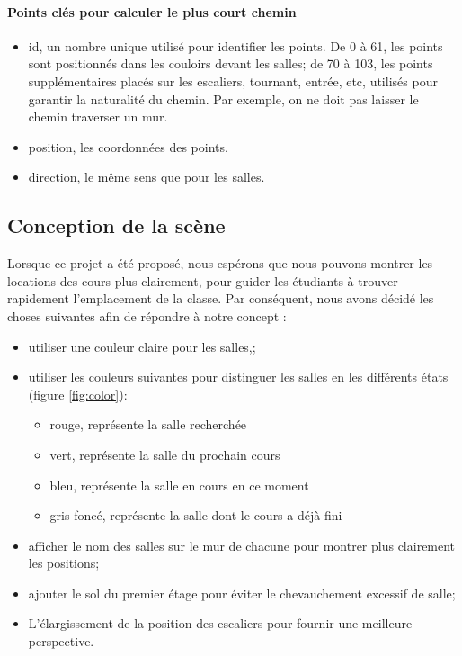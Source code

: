 \documentclass[twoside]{EPURapport}
\begin{document}
\paragraph{Points clés pour calculer le plus court chemin}

\begin{itemize}
	\item id, un nombre unique utilisé pour identifier les points. De 0 à 61, les points sont positionnés dans les couloirs devant les salles; de 70 à 103, les points supplémentaires placés sur les escaliers, tournant, entrée, etc, utilisés pour garantir la naturalité du chemin. Par exemple, on ne doit pas laisser le chemin traverser un mur. 
    \item position, les coordonnées des points.
    \item direction, le même sens que pour les salles.
\end{itemize}

\subsection{Conception de la scène}
Lorsque ce projet a été proposé, nous espérons que nous pouvons montrer les locations des cours plus clairement, pour guider les étudiants à trouver rapidement l'emplacement de la classe. Par conséquent, nous avons décidé les choses suivantes afin de répondre à notre concept :

\begin{itemize}
\item utiliser une couleur claire pour les salles,;
\item utiliser les couleurs suivantes pour distinguer les salles en les différents états (figure \ref{fig:color}):
	\begin{itemize}
	\item rouge, représente la salle recherchée
    \item vert, représente la salle du prochain cours
    \item bleu, représente la salle en cours en ce moment
    \item gris foncé, représente la salle dont le cours a déjà fini
	\end{itemize}

\item afficher le nom des salles sur le mur de chacune pour montrer plus clairement les positions;

\item ajouter le sol du premier étage pour éviter le chevauchement excessif de salle;

\item L'élargissement de la position des escaliers pour fournir une meilleure perspective.

\end{itemize}
\end{document}
